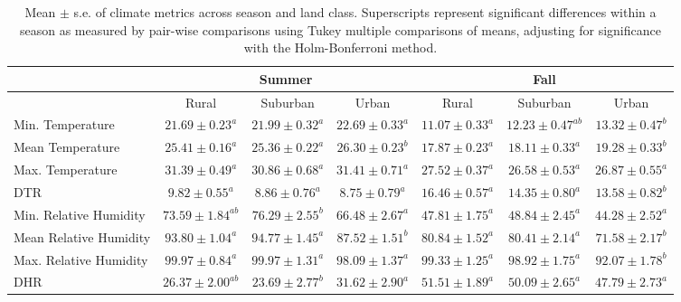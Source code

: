 \documentclass[12pt]{article}
\begin{document}
\begin{landscape}

\begin{table}[]
\centering
\caption{Mean $\pm$ s.e. of climate metrics across season and land class. Superscripts represent significant differences within a season as measured by pair-wise comparisons using Tukey multiple comparisons of means, adjusting for significance with the Holm-Bonferroni method.}
\label{Table:climate}
\begin{tabular}{l|ccc|ccc}
                       & \multicolumn{3}{c}{Summer}                            & \multicolumn{3}{c}{Fall}                              \\
\hline
                       & Rural            & Suburban        & Urban            & Rural            & Suburban         & Urban           \\
\hline
Min. Temperature       & $21.69 \pm 0.23^a$  & $21.99 \pm 0.32^a$ & $22.69 \pm 0.33^a$  & $11.07 \pm 0.33^a$  & $12.23 \pm 0.47^{ab}$ & $13.32 \pm 0.47^b$ \\
Mean Temperature       & $25.41 \pm 0.16^a$  & $25.36 \pm 0.22^a$ & $26.30 \pm 0.23^b$  & $17.87 \pm 0.23^a$  & $18.11 \pm 0.33^a$  & $19.28 \pm 0.33^b$ \\
Max. Temperature       & $31.39 \pm 0.49^a$  & $30.86 \pm 0.68^a$ & $31.41 \pm 0.71^a$  & $27.52 \pm 0.37^a$  & $26.58 \pm 0.53^a$  & $26.87 \pm 0.55^a$ \\
DTR                    & $9.82 \pm 0.55^a$   & $8.86 \pm 0.76^a$  & $8.75 \pm 0.79^a$   & $16.46 \pm 0.57^a$  & $14.35 \pm 0.80^a$  & $13.58 \pm 0.82^b$ \\
Min. Relative Humidity & $73.59 \pm 1.84^{ab}$ & $76.29 \pm 2.55^b$ & $66.48 \pm 2.67^a$  & $47.81 \pm 1.75^a$  & $48.84 \pm 2.45^a$  & $44.28 \pm 2.52^a$ \\
Mean Relative Humidity & $93.80 \pm 1.04^a$ & $94.77 \pm 1.45^a$ & $87.52 \pm 1.51^b$ & $80.84  \pm 1.52^a$ & $80.41 \pm 2.14^a$  & $71.58 \pm 2.17^b$ \\
Max. Relative Humidity & $99.97 \pm 0.84^a$  & $99.97 \pm 1.31^a$ & $98.09 \pm 1.37^a$  & $99.33 \pm 1.25^a$  & $98.92 \pm 1.75^a$  & $92.07 \pm 1.78^b$ \\
DHR                    & $26.37 \pm 2.00^{ab}$ & $23.69 \pm 2.77^b$ & $31.62 \pm 2.90^a$  & $51.51 \pm 1.89^a$  & $50.09 \pm 2.65^a$  & $47.79 \pm 2.73^a$
\end{tabular}
\end{table}


\end{landscape}
\end{document}
